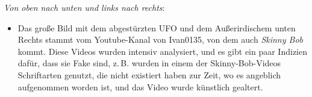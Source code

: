 \documentclass{scrartcl}
\begin{document}
\textit{Von oben nach unten und links nach rechts}:

\begin{itemize}
	\item Das große Bild mit dem abgestürzten UFO und dem Außerirdischem unten Rechts stammt vom Youtube-Kanal von Ivan0135, von dem auch \textit{Skinny Bob} kommt. Diese Videos wurden intensiv analysiert, und es gibt ein paar Indizien dafür, dass sie Fake sind, z.\,B. wurden in einem der Skinny-Bob-Videos Schriftarten genutzt, die nicht existiert haben zur Zeit, wo es angeblich aufgenommen worden ist, und das Video wurde künstlich gealtert. 


\end{itemize}
\end{document}
